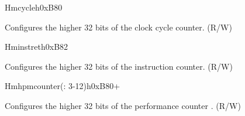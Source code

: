 \begin{register}{H}{mcycleh}{0xB80}\label{regdesc:LPMCYCLEH}
%
\regnewline%
\begin{regdesc}\begin{reglist}
\label{fielddesc:LPMCYCLEH}\item [MCYCLEH] Configures the higher 32 bits of the clock cycle counter. (R/W)
\end{reglist}\end{regdesc}
\end{register}

\begin{register}{H}{minstreth}{0xB82}\label{regdesc:LPMINSTRETH}
%
\regnewline%
\begin{regdesc}\begin{reglist}
\label{fielddesc:LPMINSTRETH}\item [MINSTRETH] Configures the higher 32 bits of the instruction counter. (R/W)
\end{reglist}\end{regdesc}
\end{register}


\begin{register}{H}{mhpmcounter(: 3-12)h}{0xB80+}\label{regdesc:LPMHPMCOUNTERH}
%
\regnewline%
\begin{regdesc}\begin{reglist}
\label{fielddesc:LPMHMPCOUNTERH}\item [MHPMCOUNTER\regindex{n}h] Configures the higher 32 bits of the performance counter . (R/W)
\end{reglist}\end{regdesc}
\end{register}


